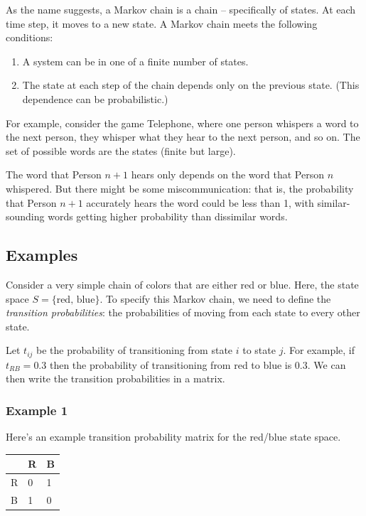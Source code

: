 \documentclass[
  letterpaper,
  DIV=11,
  numbers=noendperiod]{scrreprt}
\providecommand{\tightlist}{%
  \setlength{\itemsep}{0pt}\setlength{\parskip}{0pt}}
\begin{document}
As the name suggests, a Markov chain is a chain -- specifically of
states. At each time step, it moves to a new state. A Markov chain meets
the following conditions:

\begin{enumerate}
\def\labelenumi{\arabic{enumi}.}
\tightlist
\item
  A system can be in one of a finite number of states.
\item
  The state at each step of the chain depends only on the previous
  state. (This dependence can be probabilistic.)
\end{enumerate}

For example, consider the game Telephone, where one person whispers a
word to the next person, they whisper what they hear to the next person,
and so on. The set of possible words are the states (finite but large).

The word that Person \(n+1\) hears only depends on the word that Person
\(n\) whispered. But there might be some miscommunication: that is, the
probability that Person \(n+1\) accurately hears the word could be less
than 1, with similar-sounding words getting higher probability than
dissimilar words.

\subsection{Examples}\label{examples}

Consider a very simple chain of colors that are either red or blue.
Here, the state space \(S = \{ \text{red, blue} \}\). To specify this
Markov chain, we need to define the \emph{transition probabilities}: the
probabilities of moving from each state to every other state.

Let \(t_{ij}\) be the probability of transitioning from state \(i\) to
state \(j\). For example, if \(t_{RB} = 0.3\) then the probability of
transitioning from red to blue is 0.3. We can then write the transition
probabilities in a matrix.

\subsubsection{Example 1}\label{markov-example1}

Here's an example transition probability matrix for the red/blue state
space.

\begin{longtable}[]{@{}lll@{}}
\toprule\noalign{}
& R & B \\
\midrule\noalign{}
\endhead
\bottomrule\noalign{}
\endlastfoot
R & 0 & 1 \\
B & 1 & 0 \\
\end{longtable}
\end{document}
